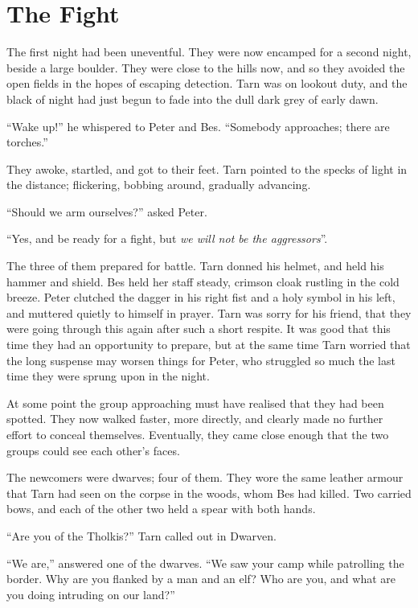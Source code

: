 \chapter{The Fight}

The first night had been uneventful.  They were now encamped for a second night, beside a large boulder.  They were close to the hills now, and so they avoided the open fields in the hopes of escaping detection.  Tarn was on lookout duty, and the black of night had just begun to fade into the dull dark grey of early dawn.

``Wake up!'' he whispered to Peter and Bes.  ``Somebody approaches; there are torches.''

They awoke, startled, and got to their feet.  Tarn pointed to the specks of light in the distance; flickering, bobbing around, gradually advancing.

``Should we arm ourselves?'' asked Peter.

``Yes, and be ready for a fight, but \emph{we will not be the aggressors}''.

The three of them prepared for battle.  Tarn donned his helmet, and held his hammer and shield.  Bes held her staff steady, crimson cloak rustling in the cold breeze.  Peter clutched the dagger in his right fist and a holy symbol in his left, and muttered quietly to himself in prayer.  Tarn was sorry for his friend, that they were going through this again after such a short respite.  It was good that this time they had an opportunity to prepare, but at the same time Tarn worried that the long suspense may worsen things for Peter, who struggled so much the last time they were sprung upon in the night.

At some point the group approaching must have realised that they had been spotted.  They now walked faster, more directly, and clearly made no further effort to conceal themselves.  Eventually, they came close enough that the two groups could see each other's faces.

The newcomers were dwarves; four of them.  They wore the same leather armour that Tarn had seen on the corpse in the woods, whom Bes had killed.  Two carried bows, and each of the other two held a spear with both hands.

``Are you of the Tholkis?'' Tarn called out in Dwarven.

``We are,'' answered one of the dwarves.  ``We saw your camp while patrolling the border.  Why are you flanked by a man and an elf?  Who are you, and what are you doing intruding on our land?''


